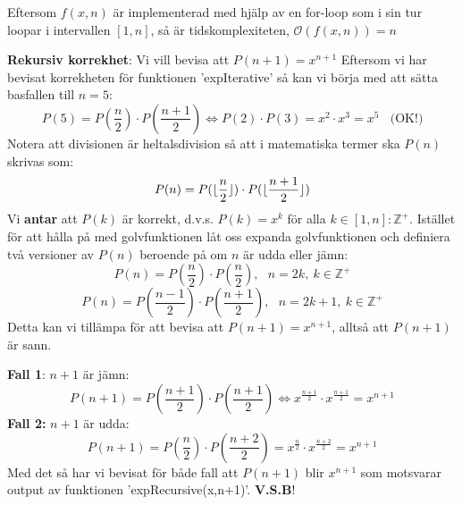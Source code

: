 \documentclass{report}
\begin{document}
\noindent
Eftersom $ f(x,n) $ är implementerad med hjälp av en for-loop som i sin tur loopar i intervallen $ [1,n] $, så är tidskomplexiteten, $ \mathcal{O}(f(x,n)) = n $ 

\vspace{30pt}
\qs{}
{
	\textbf{Rekursiv korrekhet}: Vi vill bevisa att $ P(n+1) = x^{n+1} $
}
\sol Eftersom vi har bevisat korrekheten för funktionen 'expIterative' så kan vi börja med att sätta basfallen till $ n = 5 $:
\begin{equation*}
P(5) = P( \frac{n}{2} ) \cdot P( \frac{n+1}{2} ) \iff  P(2) \cdot P(3) = x^2 \cdot x^3 = x^5\:\:\:\: \text{(OK!)}  
\end{equation*}
Notera att divisionen är heltalsdivision så att i matematiska termer ska $ P(n) $ skrivas som:
\begin{equation*}
	P(n) = P(\lfloor \frac{n}{2} \rfloor ) \cdot P( \lfloor \frac{n+1}{2} \rfloor )
\end{equation*}
Vi \textbf{antar} att $ P(k) $ är korrekt, d.v.s. $ P(k) = x^k $ för alla $ k \in [1,n] : \mathbb{Z}^+ $. Istället för att hålla på med golvfunktionen låt oss expanda golvfunktionen och definiera två versioner av $ P(n) $ beroende på om $ n $ är udda eller jämn:
\begin{equation*}
P(n) = P( \frac{n}{2} ) \cdot P( \frac{n}{2} ),\:\:\:n = 2k,\:k \in \mathbb{Z}^+ 
\end{equation*}
\begin{equation*}
	P(n) = P( \frac{n-1}{2} ) \cdot P( \frac{n+1}{2}  ),\:\:\:n = 2k+1,\:k \in \mathbb{Z}^+
\end{equation*}
Detta kan vi tillämpa för att bevisa att $ P(n+1) = x^{n+1}$, alltså att $ P(n+1) $ är sann.

\pagebreak
\noindent
\textbf{Fall 1}: $ n+1 $ är jämn:
\begin{equation}
	P(n+1) = P( \frac{n+1}{2} ) \cdot P( \frac{n+1}{2} ) \iff x^{ \frac{n+1}{2} } \cdot x^{ \frac{n+1}{2} } = x^{n+1} 
\end{equation}
\noindent
\textbf{Fall 2:} $ n+1 $ är udda:
\begin{equation}
	P(n+1) = P( \frac{n}{2} ) \cdot P( \frac{n+2}{2} ) = x^{ \frac{n}{2} } \cdot x^{ \frac{n+2}{2} } = x^{n+1} 
\end{equation}
\vspace{20pt}
\noindent
Med det så har vi bevisat för både fall att $ P(n+1) $ blir $ x^{n+1} $ som motsvarar output av funktionen 'expRecursive(x,n+1)'. \textbf{V.S.B}!\\\\
\end{document}
